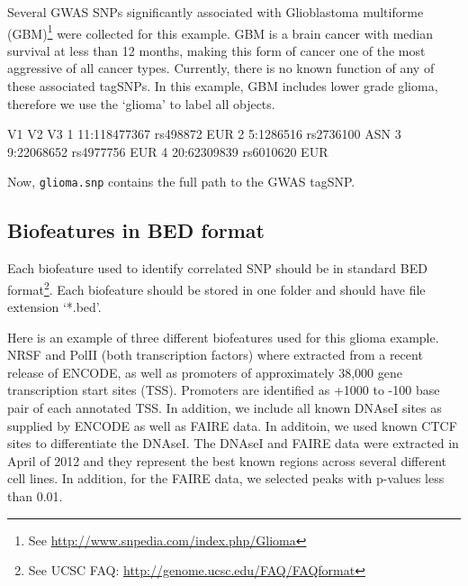 \documentclass[12pt,fullpage]{article}
\newcommand{\Robject}[1]{{\texttt{#1}}}
\begin{document}
Several GWAS SNPs significantly associated with Glioblastoma multiforme
(GBM)\footnote{See \url{http://www.snpedia.com/index.php/Glioma}} were collected
for this example. GBM is a brain cancer with median survival at less than 12
months, making this form of cancer one of the most aggressive of all cancer
types. Currently, there is no known function of any of these associated tagSNPs.
In this example, GBM includes lower grade glioma, therefore we use the `glioma'
to label all objects.

\begin{Schunk}
\begin{Soutput}
            V1        V2  V3
1 11:118477367  rs498872 EUR
2    5:1286516 rs2736100 ASN
3   9:22068652 rs4977756 EUR
4  20:62309839 rs6010620 EUR
\end{Soutput}
\end{Schunk}

Now, \Robject{glioma.snp} contains the full path to the GWAS tagSNP. 

\subsection{Biofeatures in BED format}

Each biofeature used to identify correlated SNP should be in standard BED
format\footnote{See UCSC FAQ: \url{http://genome.ucsc.edu/FAQ/FAQformat}}. Each
biofeature should be stored in one folder and should have file extension
`*.bed'.

Here is an example of three different biofeatures used for this glioma example.
NRSF and PolII (both transcription factors) where extracted from a recent
release of ENCODE, as well as promoters of approximately 38,000 gene
transcription start sites (TSS). Promoters are identified as +1000 to -100 base
pair of each annotated TSS. In addition, we include all known DNAseI sites as supplied by ENCODE as well as FAIRE data. In additoin, we used known CTCF sites to differentiate the DNAseI. The DNAseI and FAIRE data were extracted in April of 2012 and they represent the best known regions across several different cell lines. In addition, for the FAIRE data, we selected peaks with p-values less than 0.01.
\end{document}
